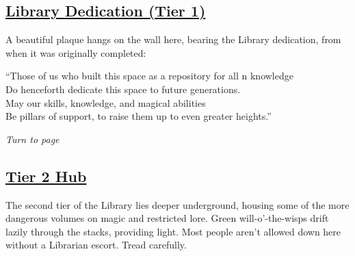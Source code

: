 \documentclass[sheet]{GL2020}
\begin{document}
\clearpage

\begin{center}\section*{\underline{Library Dedication (Tier 1)}}\end{center}
\label{LibraryDedication}

A beautiful plaque hangs on the wall here, bearing the Library dedication, from when it was originally completed:

\vspace{0.5cm}

\begin{center}
``Those of us who built this space as a repository for all \pEarth{}n knowledge\\
Do henceforth dedicate this space to future generations.\\

May our skills, knowledge, and magical abilities\\
Be pillars of support, to raise them up to even greater heights.''\\
\end{center}

\emph{Turn to page~\pageref{TierOneHub}}

\clearpage



\begin{center}\section*{\underline{Tier 2 Hub}}\end{center}
\label{TierTwoHub}

The second tier of the Library lies deeper underground, housing some of the more dangerous volumes on magic and restricted lore. Green will-o’-the-wisps drift lazily through the stacks, providing light. Most people aren't allowed down here without a Librarian escort. Tread carefully. 

\vspace{0.5cm}
\end{document}
